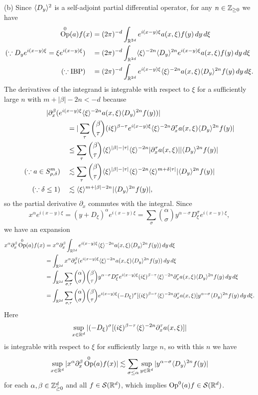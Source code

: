 \documentclass{../../large}
\DeclareMathOperator{\Op}{Op}
\begin{document}
\begin{pf}
(b)
Since $\langle D_y\rangle^2$ is a self-adjoint partial differential operator, for any $n\in\mathbb{Z}_{\ge0}$ we have
\begin{align*}
\Op^0(a)f(x)
&=(2\pi)^{-d}\int_{\R^{2d}}e^{i(x-y)\xi}a(x,\xi)f(y)\,dy\,d\xi\\
(\because D_ye^{i(x-y)\xi}=\xi e^{i(x-y)\xi})\quad
&=(2\pi)^{-d}\int_{\R^{2d}}\<\xi\>^{-2n}\<D_y\>^{2n}e^{i(x-y)\xi}a(x,\xi)f(y)\,dy\,d\xi\\
(\because\text{IBP})\quad
&=(2\pi)^{-d}\int_{\R^{2d}}e^{i(x-y)\xi}\<\xi\>^{-2n}a(x,\xi)\<D_y\>^{2n}f(y)\,dy\,d\xi.
\end{align*}
The derivatives of the integrand is integrable with respect to $\xi$ for a sufficiently large $n$ with $m+|\beta|-2n<-d$ because
\begin{align*}
&\hspace{-3em}|\partial_x^\beta(e^{i(x-y)\xi}\<\xi\>^{-2n}a(x,\xi)\<D_y\>^{2n}f(y))|\\
&=|\sum_\tau{\beta\choose\tau}(i\xi)^{\beta-\tau}e^{i(x-y)\xi}\<\xi\>^{-2n}\partial_x^\tau a(x,\xi)\<D_y\>^{2n}f(y)|\\
&\le\sum_\tau{\beta\choose\tau}\<\xi\>^{|\beta|-|\tau|}\<\xi\>^{-2n}|\partial_x^\tau a(x,\xi)||\<D_y\>^{2n}f(y)|\\
(\because a\in S_{\rho,\delta}^m)\quad
&\lesssim\sum_\tau{\beta\choose\tau}\<\xi\>^{|\beta|-|\tau|}\<\xi\>^{-2n}\<\xi\>^{m+\delta|\tau|}|\<D_y\>^{2n}f(y)|\\
(\because\delta\le1)\quad
&\lesssim\<\xi\>^{m+|\beta|-2n}|\<D_y\>^{2n}f(y)|,
\end{align*}
so the partial derivative $\partial_x$ commutes with the integral.
Since
\[x^\alpha e^{i(x-y)\xi}=(y+D_\xi)^\alpha e^{i(x-y)\xi}=\sum_{\sigma}{\alpha\choose\sigma}y^{\alpha-\sigma}D_\xi^\sigma e^{i(x-y)\xi},\]
we have an expansion
\begin{align*}
x^\alpha\partial_x^\beta\Op^0(a)f(x)
&=x^\alpha\partial_x^\beta\int_{\R^{2d}}e^{i(x-y)\xi}\<\xi\>^{-2n}a(x,\xi)\<D_y\>^{2n}f(y))\,dy\,d\xi\\
&=\int_{\R^{2d}}x^\alpha\partial_x^\beta(e^{i(x-y)\xi}\<\xi\>^{-2n}a(x,\xi)\<D_y\>^{2n}f(y))\,dy\,d\xi\\
&=\int_{\R^{2d}}\sum_{\sigma,\tau}{\alpha\choose\sigma}{\beta\choose\tau}y^{\alpha-\sigma}D_\xi^{\sigma}e^{i(x-y)\xi}(i\xi)^{\beta-\tau}\<\xi\>^{-2n}\partial_x^\tau a(x,\xi)\<D_y\>^{2n}f(y)\,dy\,d\xi\\
&=\int_{\R^{2d}}\sum_{\sigma,\tau}{\alpha\choose\sigma}{\beta\choose\tau}e^{i(x-y)\xi}(-D_\xi)^{\sigma}[(i\xi)^{\beta-\tau}\<\xi\>^{-2n}\partial_x^\tau a(x,\xi)]y^{\alpha-\sigma}\<D_y\>^{2n}f(y)\,dy\,d\xi.
\end{align*}
Here
\[\sup_{x\in\mathbb{R}^d}|(-D_\xi)^{\sigma}[(i\xi)^{\beta-\tau}\langle\xi\rangle^{-2n}\partial_x^\tau a(x,\xi)]|\]
is integrable with respect to $\xi$ for sufficiently large $n$, so with this $n$ we have
\[\sup_{x\in\R^d}|x^\alpha\partial_x^\beta\Op^0(a)f(x)|\lesssim\sum_{\sigma\le\alpha}\sup_{y\in\R^d}|y^{\alpha-\sigma}\<D_y\>^{2n}f(y)|\]
for each $\alpha,\beta\in\mathbb{Z}_{\ge0}^d$ and all $f\in\mathcal{S}(\mathbb{R}^d)$, which implies $\Op^0(a)f\in\cS(\R^d)$.
\end{pf}
\end{document}

